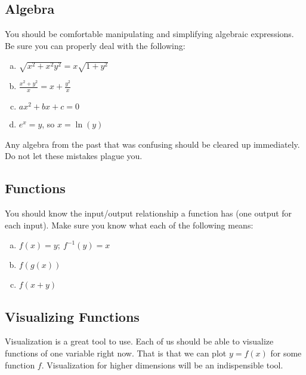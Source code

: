     \subsection{Algebra}
    You should be comfortable manipulating and simplifying algebraic expressions. Be sure you can properly deal with the following:
    \begin{enumerate}[(a)]
        \item $\displaystyle{\sqrt{x^2+x^2y^2}=x\sqrt{1+y^2}}$
        \item $\displaystyle{\frac{x^2+y^2}{x}=x+\frac{y^2}{x}}$
        \item $\displaystyle{ax^2+bx+c=0}$
        \item $e^x=y$, so $x=\ln(y)$
    \end{enumerate}
    Any algebra from the past that was confusing should be cleared up immediately.  Do not let these mistakes plague you.
    
    
    \subsection{Functions}
    You should know the input/output relationship a function has (one output for each input).  Make sure you know what each of the following means:
    \begin{enumerate}[(a)]
        \item $f(x)=y;~f^{-1}(y)=x$
        \item $f(g(x))$
        \item $f(x+y)$
    \end{enumerate}
    
    
    \subsection{Visualizing Functions}
    Visualization is a great tool to use.  Each of us should be able to visualize functions of one variable right now.  That is that we can plot $y=f(x)$ for some function $f$.  Visualization for higher dimensions will be an indispensible tool.
    
    
